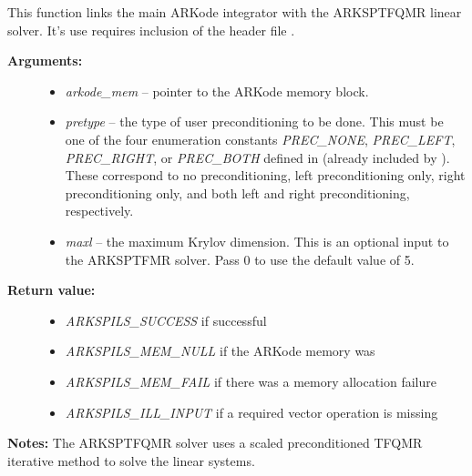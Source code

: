 \documentclass[letterpaper,10pt,english]{sphinxmanual}
\begin{document}

\begin{fulllineitems}
\label{c_interface/User_callable:ARKSptfqmr}
This function links the main ARKode integrator with the ARKSPTFQMR
linear solver.  It's use requires inclusion of the header file
.
\begin{description}
\item[{\textbf{Arguments:}}] \leavevmode\begin{itemize}
\item {} 
\emph{arkode\_mem} -- pointer to the ARKode memory block.

\item {} 
\emph{pretype} -- the type of user preconditioning to be done.  This
must be one of the four enumeration constants \emph{PREC\_NONE},
\emph{PREC\_LEFT}, \emph{PREC\_RIGHT}, or \emph{PREC\_BOTH} defined in
 (already included by
). These correspond to no preconditioning,
left preconditioning only, right preconditioning only, and
both left and right preconditioning, respectively.

\item {} 
\emph{maxl} -- the maximum Krylov dimension. This is an optional input
to the ARKSPTFMR solver. Pass 0 to use the default value of 5.

\end{itemize}

\item[{\textbf{Return value:}}] \leavevmode\begin{itemize}
\item {} 
\emph{ARKSPILS\_SUCCESS} if successful

\item {} 
\emph{ARKSPILS\_MEM\_NULL}  if the ARKode memory was 

\item {} 
\emph{ARKSPILS\_MEM\_FAIL}  if there was a memory allocation failure

\item {} 
\emph{ARKSPILS\_ILL\_INPUT} if a required vector operation is missing

\end{itemize}

\end{description}

\textbf{Notes:} The ARKSPTFQMR solver uses a scaled preconditioned TFQMR
iterative method to solve the linear systems.

\end{fulllineitems}
\end{document}
